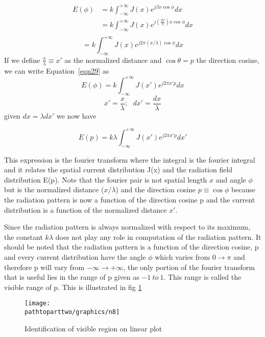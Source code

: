 \begin{align*}
E(\phi) &= k\int_{-\infty}^{+\infty}J(x) e^{j\beta x \cos\phi}dx \\
&= k\int_{-\infty}^{+\infty}J(x) e^{j(\frac{2\pi}{\lambda}) x \cos\phi}dx\\
\end{align*}
\begin{equation}
=k\int_{-\infty}^{+\infty}J(x) e^{j2\pi(x/\lambda)  \cos\phi}dx
\label{eqn29}
\end{equation}
If we define $\frac{x}{\lambda} \equiv x'$ as the normalized distance and $\cos\theta = p$ 
the direction cosine, we can write Equation~\ref{eqn29} as 
$$E(\phi) = k\int_{-\infty}^{+\infty}J(x') e^{j2\pi x' p }dx$$
$$ x' = \frac{x}{\lambda}; \ \ \ dx' = \frac{dx}{\lambda}$$
given $dx = \lambda dx'$ we now have

\begin{equation}
E(p) = k\lambda\int_{-\infty}^{+\infty}J(x') e^{j2\pi x' p}dx'
\label{eqn30}	
\end{equation}

This expression is the fourier transform where  the integral is the fourier integral and it relates the spatial current distribution J(x) and the radiation field distribution E(p). Note that the fourier pair is not spatial length $x$ and angle  $\phi$ but is the normalized distance  ($x/\lambda$) and the direction cosine $ p \equiv \cos\phi$ because the radiation pattern is now a function of the direction cosine p and the current distribution is a function of the normalized distance $x'$.

Since the radiation pattern is always normalized with respect to its maximum, the constant $k\lambda$ does not play any role in computation of the radiation pattern. It should be noted that the radiation pattern is a function of the direction cosine, p and every current distribution have the angle $\phi$ which varies from $0\to\pi$ and therefore p will vary from $-\infty\to +\infty$, the only portion of the fourier transform that is useful lies in the range of p given as $-1 \ to\ 1$. This range is called the visible range of p. This is illustrated in fig \ref{fig:8}
\begin{figure}[h]
\centering
\texttt{[image: \\pathtoparttwo/graphics/n8]}
\caption{Identification of visible region on linear plot}
\label{fig:8}
\end{figure}

